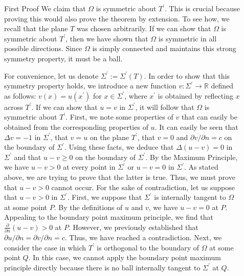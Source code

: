 \documentclass[final]{beamer}
\newlength{\sepwidth}
\newlength{\colwidth}
\newcommand{\separatorcolumn}{\begin{column}{\sepwidth}\end{column}}
\begin{document}
\begin{frame}[t]
\begin{columns}[t]
\begin{column}{\colwidth}
\begin{block}{First Proof}
    We claim that $\Omega$ is symmetric about $T^\prime$. This is crucial because proving this would also prove the theorem by extension. To see how, we recall that the plane $T$ was chosen arbitrarily. If we can show that $\Omega$ is symmetric about $T^\prime$, then we have shown that $\Omega$ is symmetric in all possible directions. Since $\Omega$ is simply connected and maintains this strong symmetry property, it must be a ball.
    
    For convenience, let us denote $\Sigma^\prime := \Sigma^\prime(T)$. In order to show that this symmetry property holds, we introduce a new function $v: \Sigma^\prime \rightarrow \mathbb{R}$ defined as follows: $v(x) = u(x^\prime)$ for $x \in \Sigma^\prime$, where $x^\prime$ is obtained by reflecting $x$ across $T^\prime$. If we can show that $u = v$ in $\Sigma^\prime$, it will follow that $\Omega$ is symmetric about $T^\prime$. First, we note some properties of $v$ that can easily be obtained from the corresponding properties of $u$. It can easily be seen that $\Delta v = -1$ in $\Sigma^\prime$, that $v = u$ on the plane $T^\prime$, that $v = 0$ and $\partial{v}/\partial{n} = c$ on the boundary of $\Sigma^\prime$. Using these facts, we deduce that $\Delta(u-v) = 0$ in $\Sigma^\prime$ and that $u-v \geq 0$ on the boundary of $\Sigma^\prime$. By the Maximum Principle, we have $u - v > 0$ at every point in $\Sigma^\prime$ or $u-v = 0$ in $\Sigma^\prime$. As stated above, we are trying to prove that the latter is true. Thus, we must prove that $u-v > 0$ cannot occur. For the sake of contradiction, let us suppose that $u - v > 0$ in $\Sigma^\prime$. First, we suppose that $\Sigma^\prime$ is internally tangent to $\Omega$ at some point $P$. By the definitions of $u$ and $v$, we have $u - v = 0$ at $P$. Appealing to the boundary point maximum principle, we find that $\frac{\partial}{\partial{n}}(u-v) > 0$ at $P$. However, we previously established that $\partial{u}/\partial{n} = \partial{v}/\partial{n} = c$. Thus, we have reached a contradiction. Next, we consider the case in which $T^\prime$ is orthogonal to the boundary of $\Omega$ at some point $Q$. In this case, we cannot apply the boundary point maximum principle directly because there is no ball internally tangent to $\Sigma^\prime$ at $Q$. 

\end{block}

  
\end{column}

\separatorcolumn

\begin{column}{\colwidth}


\end{column}
\end{columns}
\end{frame}
\end{document}

